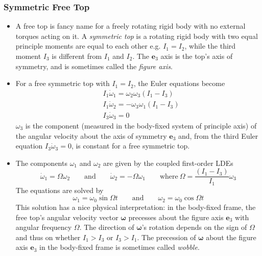 \documentclass[11pt, a4paper]{article}
\newcommand{\eqtext}[1]{\qquad \text{#1} \qquad}
\newcommand{\e}{\bm{e}} %
\begin{document}
\subsubsection{Symmetric Free Top}
\begin{itemize}
	\item A free top is fancy name for a freely rotating rigid body with no external torques acting on it. A \textit{symmetric top} is a rotating rigid body with two equal principle moments are equal to each other e.g. $ I_{1} = I_{2}$, while the third moment $ I_{3} $ is different from $ I_{1} $ and $ I_{2} $. The $ \e_{3} $ axis is the top's axis of symmetry, and is sometimes called the \textit{figure axis}.
	
	\item For a free symmetric top with $ I_{1} = I_{2} $, the Euler equations become
	\begin{align*}
		&I_{1}\dot {\omega }_{1}  = \omega_{2}\omega_{3} (I_{1}-I_{3})\\
		&I_{1}\dot  {\omega }_{2}  = - \omega_{3}\omega_{1} (I_{1}-I_{3})\\
		&I_{3}\dot{\omega}_{3} = 0
	\end{align*}
	$ \omega_{3} $ is the component (measured in the body-fixed system of principle axis) of the angular velocity  about the axis of symmetry $ \e_{3} $ and, from the third Euler equation $ I_{3} \dot{\omega}_{3} = 0$, is constant for a free symmetric top.
	
	\item The components $ \omega_{1} $ and $ \omega_{2} $ are given by the coupled first-order LDEs
	\begin{equation*}
		\dot \omega_{1} = \Omega\omega_{2} \eqtext{and} \dot \omega_{2} = - \Omega \omega_{1} \qquad \text{where} \ \Omega = \frac{(I_{1} - I_{3})}{I_{1}} \omega_{3}
	\end{equation*}
	The equations are solved by 
	\begin{equation*}
		\omega_{1} = \omega_{0}\sin \Omega t \eqtext{and} \omega_{2} = \omega_{0}\cos \Omega t
	\end{equation*}
	This solution has a nice physical interpretation: in the body-fixed frame, the free top's angular velocity vector $ \bm{\omega} $ precesses about the figure axis $ \e_{3} $ with angular frequency $ \Omega $. The direction of $ \bm{\omega} $'s rotation depends on the sign of $ \Omega $ and thus on whether $ I_1 > I_{3} $ or $ I_{3} > I_{1} $. The precession of $ \bm{\omega} $ about the figure axis $ \e_{3} $ in the body-fixed frame is sometimes called \textit{wobble}.
	

\end{itemize}
\end{document}
